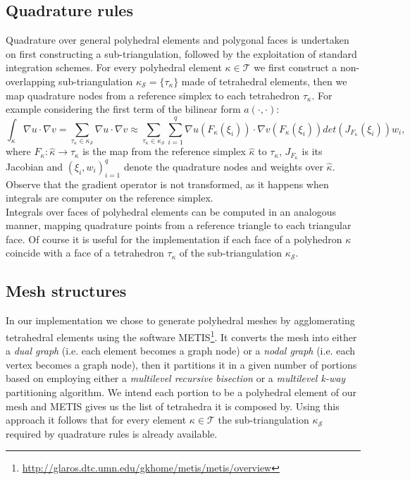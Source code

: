 \documentclass[12pt, a4paper]{article}
\theoremstyle{definition}
\theoremstyle{plain}
\theoremstyle{plain}
\theoremstyle{definition}
\begin{document}
\subsection{Quadrature rules}
Quadrature over general polyhedral elements and polygonal faces is undertaken 
on first constructing a sub-triangulation, followed by the exploitation of 
standard integration schemes. For every polyhedral element $\kappa \in 
\mathcal{T}$ we first construct a non-overlapping sub-triangulation 
$\kappa_\mathcal{S} = \{\tau_\kappa\}$ made of tetrahedral elements, then we 
map quadrature nodes from a reference simplex to each tetrahedron 
$\tau_\kappa$. For example considering the first term of the bilinear form 
$a(\cdot, \cdot)$:
\begin{equation*}
	\int_\kappa \nabla u \cdot \nabla v = \sum_{\tau_\kappa \in \kappa_\mathcal{S}} \nabla u \cdot \nabla v \approx \sum_{\tau_\kappa \in \kappa_\mathcal{S}} \sum_{i=1}^{q} \nabla u(F_\kappa(\xi_i)) \cdot \nabla v(F_\kappa(\xi_i)) det(J_{F_\kappa}(\xi_i))w_i,
\end{equation*}
where $F_\kappa: \hat{\kappa} \rightarrow \tau_\kappa$ is the map from the 
reference simplex $\hat{\kappa}$ to $\tau_\kappa$, $J_{F_\kappa}$ is its 
Jacobian	and $(\xi_i, w_i)^q_{i=1}$ denote the quadrature nodes and weights 
over $\hat{\kappa}$. Observe that the gradient operator is not transformed, as 
it happens when integrals are computer on the reference simplex.\\
Integrals over faces of polyhedral elements can be computed in an analogous 
manner, mapping quadrature points from a reference triangle to each triangular 
face. Of course it is useful for the implementation if each face of a 
polyhedron $\kappa$ coincide with a face of a tetrahedron $\tau_\kappa$ of the 
sub-triangulation $\kappa_\mathcal{S}$.
\subsection{Mesh structures}
In our implementation we chose to generate polyhedral meshes by agglomerating 
tetrahedral elements using the software 
METIS\footnote{\url{http://glaros.dtc.umn.edu/gkhome/metis/metis/overview}}. It 
converts the mesh into either a \textit{dual graph} (i.e. each element becomes 
a graph node) or a \textit{nodal graph} (i.e. each vertex becomes a graph 
node), then it partitions it in a given number of portions based on employing 
either a \textit{multilevel recursive bisection} or a \textit{multilevel k-way} 
partitioning algorithm. We intend each portion to be a polyhedral element of 
our mesh and METIS gives us the list of tetrahedra it is composed by. Using 
this approach it follows that for every element $\kappa \in \mathcal{T}$ the 
sub-triangulation $\kappa_\mathcal{S}$ required by quadrature rules is already 
available.
\end{document}
